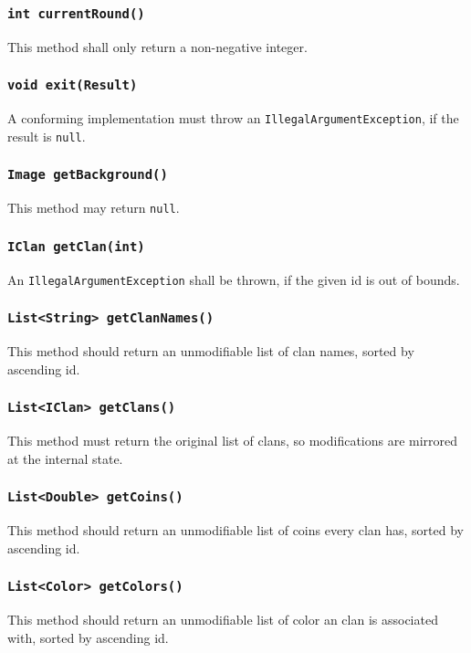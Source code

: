 \documentclass{article}
\begin{document}
\subsubsection{\texttt{int currentRound()}}
This method shall only return a non-negative integer.

\subsubsection{\texttt{void exit(Result)}}
A conforming implementation must throw an \texttt{IllegalArgumentException},
if the result is \texttt{null}.

\subsubsection{\texttt{Image getBackground()}}
This method may return \texttt{null}.

\subsubsection{\texttt{IClan getClan(int)}}
An \texttt{IllegalArgumentException} shall be thrown, if the given
id is out of bounds.

\subsubsection{\texttt{List<String> getClanNames()}}
This method should return an unmodifiable list of clan names, sorted by
ascending id.

\subsubsection{\texttt{List<IClan> getClans()}}
This method must return the original list of clans, so modifications are mirrored at the internal state.

\subsubsection{\texttt{List<Double> getCoins()}}
This method should return an unmodifiable list of coins every clan has, sorted by
ascending id.

\subsubsection{\texttt{List<Color> getColors()}}
This method should return an unmodifiable list of color an clan is associated with, sorted by
ascending id.
\end{document}
